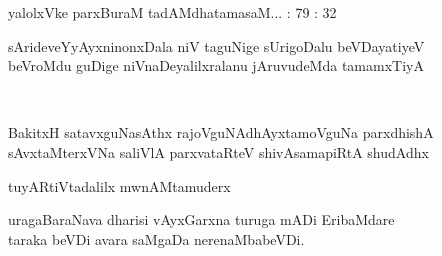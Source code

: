 \begin{entry}
\gl{}
\info{}{}{}{}
\begin{shl}
yalolxVke parxBuraM tadAMdhatamasaM... : 79 : 32
\end{shl}
\end{entry}

\begin{entry}
\begin{shl}
sArideveYyAyxninonxDala niV taguNige sUrigoDalu beVDayatiyeV\\
beVroMdu guDige niVnaDeyalilxralanu jAruvudeMda tamamxTiyA
\end{shl}
\end{entry}

\begin{entry}
\\
\end{entry}

\begin{entry}
\begin{shl}
BakitxH satavxguNasAthx rajoVguNAdhAyxtamoVguNa parxdhishA\\
sAvxtaMterxVNa saliVlA parxvataRteV shivAsamapiRtA shudAdhx
\end{shl}
\end{entry}

\begin{entry}
\begin{shl}
tuyARtiVtadalilx mwnAMtamuderx
\end{shl}
\end{entry}

\begin{entry}
\begin{shl}
uragaBaraNava dharisi vAyxGarxna turuga mADi EribaMdare\\
taraka beVDi avara saMgaDa nerenaMbabeVDi.
\end{shl}
\end{entry}

